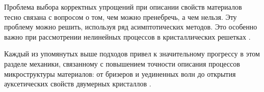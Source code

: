 	
Проблема выбора корректных упрощений при описании свойств материалов тесно связана с вопросом о том, чем можно пренебречь, а чем нельзя. Эту проблему можно решить, используя ряд асимптотических методов. Это особенно важно при рассмотрении нелинейных процессов в кристаллических решетках \cite{Maug, Zabus, engbook83, Manev, Zab, engber, PorBer, PorBer2, porkros, porosmich1, porosmich2}.
	
Каждый из упомянутых выше подходов привел к значительному прогрессу в этом разделе механики, связанному с повышением точности описания процессов микроструктуры материалов: от бризеров и уединенных волн до открытия ауксетических свойств двумерных кристаллов \cite{erof_pav}.
	
